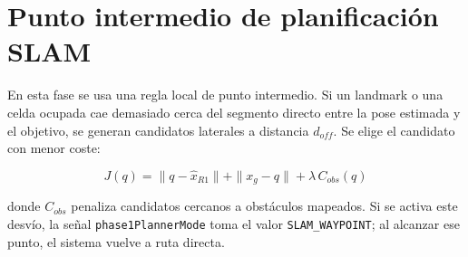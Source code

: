 \section{Punto intermedio de planificación SLAM}

En esta fase se usa una regla local de punto intermedio. Si un landmark o una
celda ocupada cae demasiado cerca del segmento directo entre la pose estimada y
el objetivo, se generan candidatos laterales a distancia \(d_{off}\). Se elige
el candidato con menor coste:

\[
J(q) = \|q-\hat{x}_{R1}\| + \|x_g-q\| + \lambda\,C_{obs}(q)
\]

donde \(C_{obs}\) penaliza candidatos cercanos a obstáculos mapeados. Si se
activa este desvío, la señal \texttt{phase1PlannerMode} toma el valor
\texttt{SLAM\_WAYPOINT}; al alcanzar ese punto, el sistema vuelve a ruta
directa.

